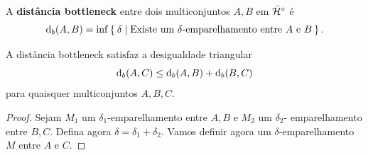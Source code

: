 \begin{defi}
    A \textbf{distância bottleneck} entre dois multiconjuntos $A,B$ em $\bar{\mathcal{H}}^\circ$ é
    \begin{equation*}
        \text{d}_b(A,B) = \inf \Set{\delta | \text{Existe um } \delta \text{-emparelhamento entre 
        } A \text{ e } B}.
    \end{equation*}
\end{defi}

\begin{propo}
    A distância bottleneck satisfaz a desigualdade triangular
    \begin{equation*}
        \text{d}_b(A,C) \leq \text{d}_b(A,B) + \text{d}_b(B,C)
    \end{equation*}
    para quaisquer multiconjuntos $A, B, C$. 
\end{propo}
\begin{proof}
    Sejam $M_1$ um $\delta_1$-emparelhamento entre $A,B$ e $M_2$ um $\delta_2$-
    emparelhamento entre $B,C$. Defina agora $\delta = \delta_1 + \delta_2$. 
    Vamos definir agora um $\delta$-emparelhamento $M$ entre $A$ e $C$.
    

\end{proof}
